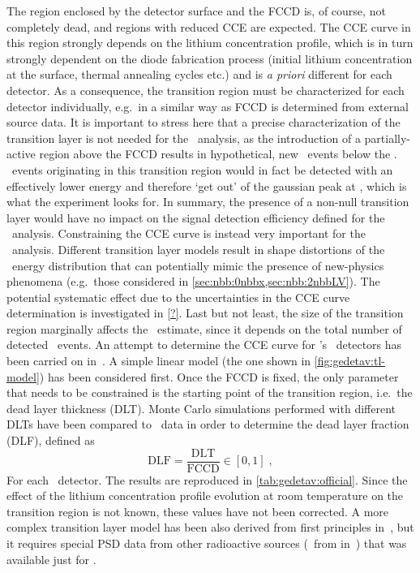 The region enclosed by the detector surface and the FCCD is, of course, not completely
dead, and regions with reduced CCE are expected. The CCE curve in this region strongly
depends on the lithium concentration profile, which is in turn strongly dependent on the
diode fabrication process (initial lithium concentration at the surface, thermal annealing
cycles etc.) and is \emph{a priori} different for each detector. As a consequence, the
transition region must be characterized for each detector individually, e.g.~in a similar
way as FCCD is determined from external source data.
\newpar
It is important to stress here that a precise characterization of the transition layer is
not needed for the \onbb\ analysis, as the introduction of a partially-active region above
the FCCD results in hypothetical, new \onbb\ events below the \qbb. \onbb\ events
originating in this transition region would in fact be detected with an effectively lower
energy and therefore `get out' of the gaussian peak at \qbb, which is what the experiment
looks for. In summary, the presence of a non-null transition layer would have no impact on
the signal detection efficiency defined for the \onbb\ analysis. Constraining the CCE
curve is instead very important for the \nnbb\ analysis. Different transition layer models
result in shape distortions of the \nnbb\ energy distribution that can potentially mimic
the presence of new-physics phenomena (e.g.~those considered in
\cref{sec:nbb:0nbbx,sec:nbb:2nbbLV}). The potential systematic effect due to the
uncertainties in the CCE curve determination is investigated in \cref{?}. Last but not
least, the size of the transition region marginally affects the \thalftwo\ estimate, since
it depends on the total number of detected \nnbb\ events.
\newpar
An attempt to determine the CCE curve for \gerda's \bege\ detectors has been carried on
in~\cite{Lehnert2016}. A simple linear model (the one shown in
\cref{fig:gedetav:tl-model}) has been considered first. Once the FCCD is fixed, the only
parameter that needs to be constrained is the starting point of the transition region,
i.e.~the dead layer thickness (DLT). Monte Carlo simulations performed with different DLTs
have been compared to \Am\ data in order to determine the dead layer fraction (DLF),
defined as
\[
  \text{DLF} = \frac{\text{DLT}}{\text{FCCD}} \in [0,1] \;,
\]
For each \bege\ detector. The results are reproduced in \cref{tab:gedetav:official}. Since
the effect of the lithium concentration profile evolution at room temperature on the
transition region is not known, these values have not been corrected. A more complex
transition layer model has been also derived from first principles in~\cite{Lehnert2016},
but it requires special PSD data from other radioactive sources (\aoe\ from 
in~\cite{Lehnert2016}) that was available just for .

